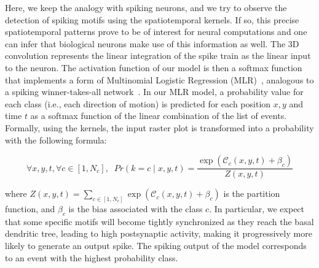 \documentclass[default]{sn-jnl}%
\theoremstyle{thmstyleone}%
\theoremstyle{thmstyletwo}%
\theoremstyle{thmstylethree}%
\newcommand{\bias}{\beta} %
\newcommand{\timev}{t} %
\newcommand{\class}{c} %
\begin{document}
Here, we keep the analogy with spiking neurons, and we try to observe the detection of spiking motifs using the spatiotemporal kernels. If so, this precise spatiotemporal patterns prove to be of interest for neural computations and one can infer that biological neurons make use of this information as well. The 3D convolution represents the linear integration of the spike train as the linear input to the neuron. The activation function of our model is then a softmax function that implements a form of Multinomial Logistic Regression (MLR)~\citep{grimaldi_robust_2022}, analogous to a spiking winner-takes-all network~\citep{nessler_bayesian_2013}. In our MLR model, a probability value for each class (i.e., each direction of motion) is predicted for each position $x, y$ and time $\timev$ as a softmax function of the linear combination of the list of events. Formally, using the kernels, the input raster plot is transformed into a probability with the following formula:
%
\begin{linenomath*}
\begin{equation}\label{eq:mlr}
    \forall x, y, \timev, \forall \class \in [1, N_\class], \; \;
Pr(k=\class \; \vert \;  x, y, \timev) =
\frac {\exp  (\mathcal{C}_\class(x, y, \timev) +\bias_\class) }{Z(x, y, \timev)}
\end{equation} 
\end{linenomath*}
%
where $Z(x, y, \timev)=\sum_{\class \in [1, N_\class]} \exp (\mathcal{C}_\class(x, y, \timev) +\bias_\class)$ is the partition function, and $\bias_\class$ is the bias associated with the class $\class$. 
In particular, we expect that some specific motifs will become tightly synchronized as they reach the basal dendritic tree, leading to high postsynaptic activity, making it progressively more likely to generate an output spike. The spiking output of the model corresponds to an event with the highest probability class.
\end{document}
